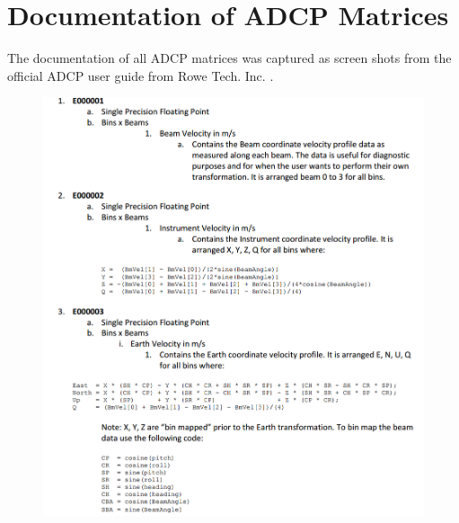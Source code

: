 \appendix

\chapter{Documentation of ADCP Matrices }
The documentation of all ADCP matrices was captured as screen shots from the official ADCP user guide from Rowe Tech. Inc. \cite{adcp_def} .

\begin{figure}[ht]
\centering
      \includegraphics[width=1\textwidth]{ens1}
\end{figure}

